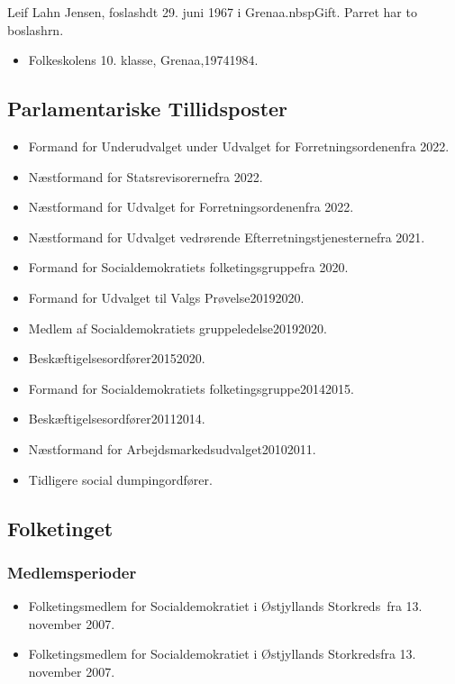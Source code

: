 \documentclass[11pt, a4paper]{awesome-cv}
\begin{document}
\makecvheader[R]
\makelettertitle
\begin{cvletter}
Leif Lahn Jensen, foslashdt 29. juni 1967 i Grenaa.nbspGift. Parret har to boslashrn.

\begin{itemize}
\item Folkeskolens 10. klasse, Grenaa,19741984.
\end{itemize}
\subsection*{Parlamentariske Tillidsposter}
\begin{itemize}
\item Formand for Underudvalget under Udvalget for Forretningsordenenfra 2022.
\item Næstformand for Statsrevisorernefra 2022.
\item Næstformand for Udvalget for Forretningsordenenfra 2022.
\item Næstformand for Udvalget vedrørende Efterretningstjenesternefra 2021.
\item Formand for Socialdemokratiets folketingsgruppefra 2020.
\item Formand for Udvalget til Valgs Prøvelse20192020.
\item Medlem af Socialdemokratiets gruppeledelse20192020.
\item Beskæftigelsesordfører20152020.
\item Formand for Socialdemokratiets folketingsgruppe20142015.
\item Beskæftigelsesordfører20112014.
\item Næstformand for Arbejdsmarkedsudvalget20102011.
\item Tidligere social dumpingordfører.
\end{itemize}
\subsection*{Folketinget}
\subsubsection*{Medlemsperioder}
\begin{itemize}
\item Folketingsmedlem for Socialdemokratiet i Østjyllands Storkreds fra 13. november 2007.
\item Folketingsmedlem for Socialdemokratiet i Østjyllands Storkredsfra 13. november 2007.
\end{itemize}

\end{cvletter}
\end{document}
